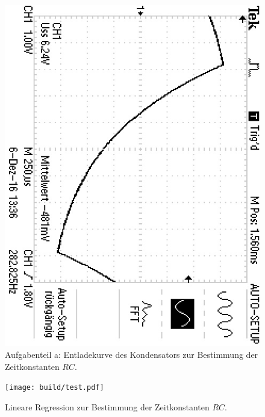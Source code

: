 \begin{figure}
	\centering
	\includegraphics[angle=90]{bilder/F0000TEK.JPG}
	\caption{Aufgabenteil a: Entladekurve des Kondensators zur Bestimmung der Zeitkonstanten $RC$.}
	\label{fig:plotrc}
\end{figure}

\begin{figure}
	\centering
	\texttt{[image: build/test.pdf]}
	\caption{Lineare Regression zur Bestimmung der Zeitkonstanten $RC$.}
	\label{fig:plota}
\end{figure}


